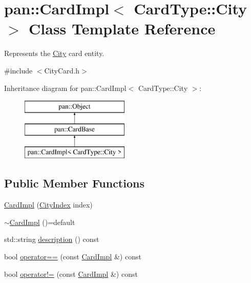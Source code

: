 \hypertarget{classpan_1_1_card_impl_3_01_card_type_1_1_city_01_4}{}\section{pan\+:\+:Card\+Impl$<$ Card\+Type\+:\+:City $>$ Class Template Reference}
\label{classpan_1_1_card_impl_3_01_card_type_1_1_city_01_4}


Represents the \hyperlink{classpan_1_1_city}{City} card entity.  




{\ttfamily \#include $<$City\+Card.\+h$>$}

Inheritance diagram for pan\+:\+:Card\+Impl$<$ Card\+Type\+:\+:City $>$\+:\begin{figure}[H]
\begin{center}
\leavevmode
\includegraphics[height=3.000000cm]{classpan_1_1_card_impl_3_01_card_type_1_1_city_01_4}
\end{center}
\end{figure}
\subsection*{Public Member Functions}
\begin{DoxyCompactItemize}
\item 
\hyperlink{classpan_1_1_card_impl_3_01_card_type_1_1_city_01_4_a9377dcb4087c82ccb0f021e0a675e9e3}{Card\+Impl} (\hyperlink{namespacepan_afaed28aa6603153dcc062a028602d697}{City\+Index} index)
\item 
\hyperlink{classpan_1_1_card_impl_3_01_card_type_1_1_city_01_4_afae904aca39e8e484641db88448e308c}{$\sim$\+Card\+Impl} ()=default
\item 
std\+::string \hyperlink{classpan_1_1_card_impl_3_01_card_type_1_1_city_01_4_a326c3eaac225bd758f19abb152deffe4}{description} () const
\item 
bool \hyperlink{classpan_1_1_card_impl_3_01_card_type_1_1_city_01_4_a7cabd76cb3e639248244e84e09bfe341}{operator==} (const \hyperlink{classpan_1_1_card_impl}{Card\+Impl} \&) const
\item 
bool \hyperlink{classpan_1_1_card_impl_3_01_card_type_1_1_city_01_4_a74d7d8382dd0d197800b24d9c22547d9}{operator!=} (const \hyperlink{classpan_1_1_card_impl}{Card\+Impl} \&) const
\end{DoxyCompactItemize}
